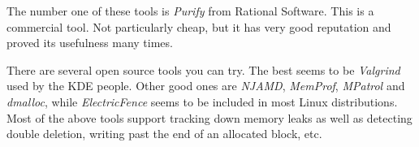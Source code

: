 The number one of these tools is \textit{Purify} from Rational Software.
This is a commercial tool. Not particularly cheap, but it has
very good reputation and proved its usefulness many times.

There are several open source tools you can try. The best seems
to be \textit{Valgrind} used by the KDE people.
Other good ones are \textit{NJAMD}, \textit{MemProf}, \textit{MPatrol}
and \textit{dmalloc}, while \textit{ElectricFence} seems
to be included in most Linux distributions.
Most of the above tools support tracking down memory leaks as well as
detecting double deletion, writing past the end of an allocated block, etc.


%
%
%
%



